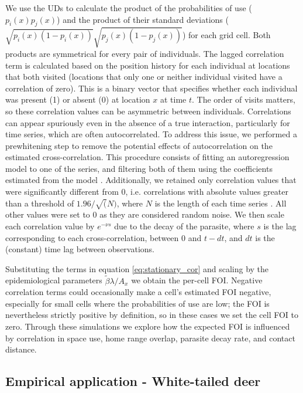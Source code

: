 \documentclass[letterpaper]{article}
\begin{document}
We use the UDs to calculate the product of the probabilities of use ($p_i(x)p_j(x)$) and the product of their standard deviations ($\sqrt{p_i(x)(1-p_i(x))}\sqrt{p_j(x)(1-p_j(x))}$) for each grid cell. Both products are symmetrical for every pair of individuals. 
The lagged correlation term is calculated based on the position history for each individual at locations that both visited (locations that only one or neither individual visited have a correlation of zero). This is a binary vector that specifies whether each individual was present (1) or absent (0) at location $x$ at time $t$. 
The order of visits matters, so these correlation values can be asymmetric between individuals. 
Correlations can appear spuriously even in the absence of a true interaction, particularly for time series, which are often autocorrelated. To address this issue, we performed a prewhitening step to remove the potential effects of autocorrelation on the estimated cross-correlation. This procedure consists of fitting an autoregression model to one of the series, and filtering both of them using the coefficients estimated from the model \citep{Dean2016}. Additionally, we retained only correlation values that were significantly different from 0, i.e. correlations with absolute values greater than a threshold of $1.96/\sqrt(N)$, where $N$ is the length of each time series \citep{Dean2016}. All other values were set to 0 as they are considered random noise.
We then scale each correlation value by $e^{-\nu s}$ due to the decay of the parasite, where $s$ is the lag corresponding to each cross-correlation, between 0 and $t-dt$, and $dt$ is the (constant) time lag between observations. 

Substituting the terms in equation \ref{eq:stationary_cor} and scaling by the epidemiological parameters $\tilde\beta\lambda/ A_x$ we obtain the per-cell FOI. Negative correlation terms could occasionally make a cell's estimated FOI negative, especially for small cells where the probabilities of use are low; the FOI is nevertheless strictly positive by definition, so in these cases we set the cell FOI to zero.
Through these simulations we explore how the expected FOI is influenced by correlation in space use, home range overlap, parasite decay rate, and contact distance. %

\subsection*{Empirical application - White-tailed deer}
\end{document}
